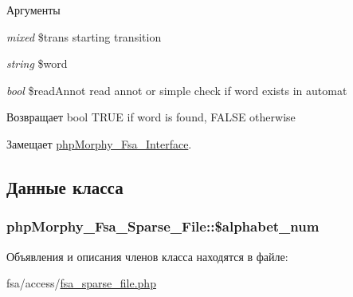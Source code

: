 \begin{DoxyParams}{Аргументы}
\item[{\em mixed}]\$trans starting transition \item[{\em string}]\$word \item[{\em bool}]\$readAnnot read annot or simple check if word exists in automat \end{DoxyParams}
\begin{DoxyReturn}{Возвращает}
bool TRUE if word is found, FALSE otherwise 
\end{DoxyReturn}


Замещает \hyperlink{interfacephpMorphy__Fsa__Interface_a6e249e8e54705e4c1d9399ff0e491ce0}{phpMorphy\_\-Fsa\_\-Interface}.



\subsection{Данные класса}
\hypertarget{classphpMorphy__Fsa__Sparse__File_a39e1eb6e590fbf7edc71824ddd52e577}{
\subsubsection[{\$alphabet\_\-num}]{\setlength{\rightskip}{0pt plus 5cm}phpMorphy\_\-Fsa\_\-Sparse\_\-File::\$alphabet\_\-num}}
\label{classphpMorphy__Fsa__Sparse__File_a39e1eb6e590fbf7edc71824ddd52e577}


Объявления и описания членов класса находятся в файле:\begin{DoxyCompactItemize}
\item 
fsa/access/\hyperlink{fsa__sparse__file_8php}{fsa\_\-sparse\_\-file.php}\end{DoxyCompactItemize}
